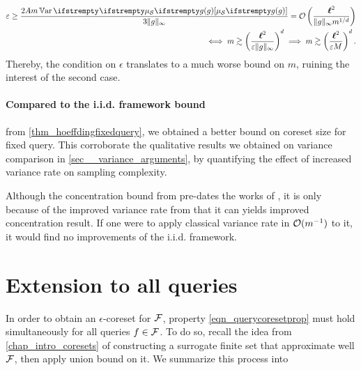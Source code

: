 \begin{align*}
	\epsilon 
	\geq  \frac{2 A m \Var{}{\empdistr{\mathcal{S}}{\twoquery}}}{3\|\twoquery \|_{\infty}}
	= \OO\left(\frac{\lipschitz^2}{\|\twoquery \|_{\infty} m^{1/d}}\right)\\
	\iff
	m \gtrsim \left(\frac{\lipschitz^2}{\epsilon\|\twoquery \|_{\infty}}\right)^d
	\implies
	m \gtrsim \left(\frac{\lipschitz^2}{\epsilon\bound}\right)^d.
\end{align*}
Thereby, the condition on $\epsilon$ translates to a much worse bound on $m$, ruining the interest of the second case.
		 


\paragraph{Compared to the i.i.d. framework bound} from \cref{thm_hoeffdingfixedquery}, we obtained a better bound on coreset size for fixed query. This corroborate the qualitative results we obtained on variance comparison in \cref{sec__variance_arguments}, by quantifying the effect of increased variance rate on sampling complexity. 

Although the concentration bound from \cite{breuer2013nevai} pre-dates the works of \cite{tremblay2018dppcoreset}, it is only because of the improved variance rate from \cite{bardenet2021sgddpp} that it can yields improved concentration result. If one were to apply classical variance rate in $\mathcal{O}(m^{-1})$ to it, it would find no improvements of the i.i.d. framework.



\section{Extension to all queries}
\label{sec_extension_all_queries}
In order to obtain an $\epsilon$-coreset for $\mathcal{F}$, property \cref{eqn_querycoresetprop} must hold simultaneously for all queries $f \in \mathcal{F}$. To do so, recall the idea from \cref{chap_intro_coresets} of constructing a surrogate finite set that approximate well $\mathcal{F}$, then apply union bound on it. We summarize this process into 

